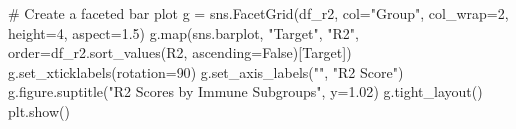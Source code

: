 \documentclass[
  letterpaper,
  DIV=11,
  numbers=noendperiod]{scrartcl}
\newenvironment{Shaded}{\begin{snugshade}}{\end{snugshade}}
\newcommand{\BuiltInTok}[1]{\textcolor[rgb]{0.00,0.23,0.31}{#1}}
\newcommand{\CommentTok}[1]{\textcolor[rgb]{0.37,0.37,0.37}{#1}}
\newcommand{\DecValTok}[1]{\textcolor[rgb]{0.68,0.00,0.00}{#1}}
\newcommand{\FloatTok}[1]{\textcolor[rgb]{0.68,0.00,0.00}{#1}}
\newcommand{\NormalTok}[1]{\textcolor[rgb]{0.00,0.23,0.31}{#1}}
\newcommand{\OperatorTok}[1]{\textcolor[rgb]{0.37,0.37,0.37}{#1}}
\newcommand{\StringTok}[1]{\textcolor[rgb]{0.13,0.47,0.30}{#1}}
\newcommand{\VariableTok}[1]{\textcolor[rgb]{0.07,0.07,0.07}{#1}}
\begin{document}
\begin{Shaded}
\begin{Highlighting}[]
\CommentTok{\# Create a faceted bar plot}
\NormalTok{g }\OperatorTok{=}\NormalTok{ sns.FacetGrid(df\_r2, col}\OperatorTok{=}\StringTok{"Group"}\NormalTok{, col\_wrap}\OperatorTok{=}\DecValTok{2}\NormalTok{, height}\OperatorTok{=}\DecValTok{4}\NormalTok{, aspect}\OperatorTok{=}\FloatTok{1.5}\NormalTok{)}
\NormalTok{g.}\BuiltInTok{map}\NormalTok{(sns.barplot, }\StringTok{"Target"}\NormalTok{, }\StringTok{"R2"}\NormalTok{, order}\OperatorTok{=}\NormalTok{df\_r2.sort\_values(}\StringTok{\textquotesingle{}R2\textquotesingle{}}\NormalTok{, ascending}\OperatorTok{=}\VariableTok{False}\NormalTok{)[}\StringTok{\textquotesingle{}Target\textquotesingle{}}\NormalTok{])}
\NormalTok{g.set\_xticklabels(rotation}\OperatorTok{=}\DecValTok{90}\NormalTok{)}
\NormalTok{g.set\_axis\_labels(}\StringTok{""}\NormalTok{, }\StringTok{"R2 Score"}\NormalTok{)}
\NormalTok{g.figure.suptitle(}\StringTok{"R2 Scores by Immune Subgroups"}\NormalTok{, y}\OperatorTok{=}\FloatTok{1.02}\NormalTok{)}
\NormalTok{g.tight\_layout()}
\NormalTok{plt.show()}
\end{Highlighting}
\end{Shaded}
\end{document}
